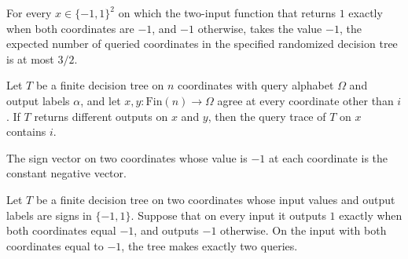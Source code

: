 \begin{theorem}
\label{FABL.nandRandomizedTree_inputCost_of_eq_neg_one}
\leanok
{}
For every $x\in\{-1,1\}^2$ on which the two-input function that returns $1$ exactly when
both coordinates are $-1$, and $-1$ otherwise, takes the value $-1$, the expected number
of queried coordinates in the specified randomized decision tree is at most $3/2$.
\end{theorem}

\begin{theorem}
\label{FABL.FiniteDecisionTree.mem_queryTrace_of_eval_ne_of_agreeExcept}
\leanok
{}
Let $T$ be a finite decision tree on $n$ coordinates with query alphabet $\Omega$ and output
labels $\alpha$, and let $x,y:\mathrm{Fin}(n)\to\Omega$ agree at every coordinate other than $i$. If $T$
returns different outputs on $x$ and $y$, then the query trace of $T$ on $x$ contains
$i$.
\end{theorem}

\begin{definition}
\label{FABL.nandAllTrue}
\leanok
{}
The sign vector on two coordinates whose value is $-1$ at each coordinate is the
constant negative vector.
\end{definition}

\begin{theorem}
\label{FABL.FiniteDecisionTree.queryCount_nandAllTrue_eq_two}
\leanok
{}
Let $T$ be a finite decision tree on two coordinates whose input values and output
labels are signs in $\{-1,1\}$. Suppose that on every input it outputs $1$ exactly when
both coordinates equal $-1$, and outputs $-1$ otherwise. On the input with both
coordinates equal to $-1$, the tree makes exactly two queries.
\end{theorem}

